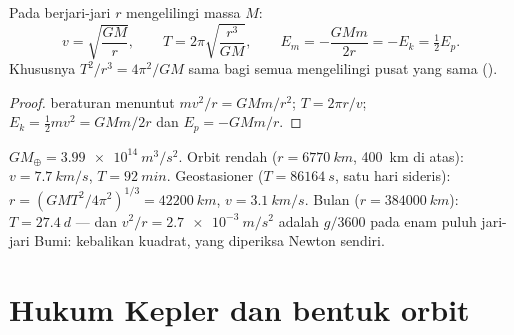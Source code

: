 \begin{theorem}\label{thm:b1:central-forces:circular}
Pada  berjari-jari $r$ mengelilingi massa $M$:
\[
v = \sqrt{\frac{GM}{r}}, \qquad
T = 2\pi\sqrt{\frac{r^3}{GM}}, \qquad
E_m = -\frac{GMm}{2r} = -E_k = \tfrac12 E_p .
\]
Khususnya $T^2/r^3 = 4\pi^2/GM$ sama bagi semua 
mengelilingi pusat yang sama ().
\end{theorem}

\begin{proof}
 beraturan menuntut  $mv^2/r = GMm/r^2$;
$T = 2\pi r/v$; $E_k = \tfrac12 mv^2 = GMm/2r$ dan $E_p = -GMm/r$.
\end{proof}

\begin{example}\label{ex:b1:central-forces:orbits}
$GM_\oplus = \qty{3.99e14}{m^3/s^2}$. Orbit rendah ($r = \qty{6770}{km}$,
\qty{400}{km} di atas): $v = \qty{7.7}{km/s}$, $T = \qty{92}{min}$.
Geostasioner ($T = \qty{86164}{s}$, satu hari sideris): $r = (GMT^2/4\pi^2)^{1/3} =
\qty{42200}{km}$, $v = \qty{3.1}{km/s}$. Bulan ($r = \qty{384000}{km}$):
$T = \qty{27.4}{d}$ --- dan  $v^2/r =
\qty{2.7e-3}{m/s^2}$ adalah $g/3600$ pada enam puluh jari-jari Bumi:
kebalikan kuadrat, yang diperiksa Newton sendiri.
\end{example}

\section{Hukum Kepler dan bentuk orbit}

